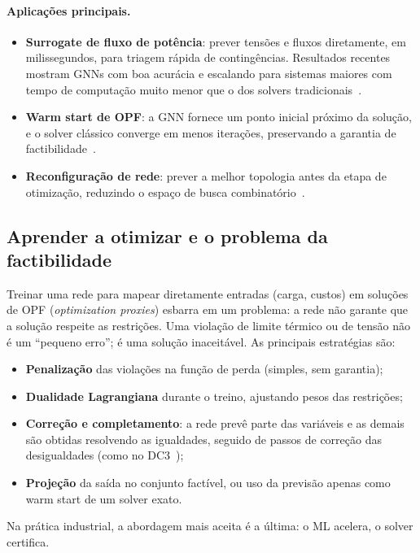 \documentclass[10pt,a4paper,oneside]{article}
\begin{document}
\paragraph{Aplicações principais.}
\begin{itemize}
  \item \textbf{Surrogate de fluxo de potência}: prever tensões e fluxos
    diretamente, em milissegundos, para triagem rápida de contingências.
    Resultados recentes mostram GNNs com boa acurácia e escalando para
    sistemas maiores com tempo de computação muito menor que o dos solvers
    tradicionais~\cite{gnnpf}.
  \item \textbf{Warm start de OPF}: a GNN fornece um ponto inicial próximo da
    solução, e o solver clássico converge em menos iterações, preservando a
    garantia de factibilidade~\cite{gnnopfinit}.
  \item \textbf{Reconfiguração de rede}: prever a melhor topologia antes da
    etapa de otimização, reduzindo o espaço de busca
    combinatório~\cite{gnnreconf}.
\end{itemize}

\subsection{Aprender a otimizar e o problema da factibilidade}

Treinar uma rede para mapear diretamente entradas (carga, custos) em
soluções de OPF (\textit{optimization proxies}) esbarra em um problema: a rede
não garante que a solução respeite as restrições. Uma violação de limite
térmico ou de tensão não é um ``pequeno erro''; é uma solução inaceitável. As
principais estratégias são:
\begin{itemize}
  \item \textbf{Penalização} das violações na função de perda (simples, sem
    garantia);
  \item \textbf{Dualidade Lagrangiana} durante o treino, ajustando pesos das
    restrições;
  \item \textbf{Correção e completamento}: a rede prevê parte das variáveis e
    as demais são obtidas resolvendo as igualdades, seguido de passos de
    correção das desigualdades (como no DC3~\cite{dc3});
  \item \textbf{Projeção} da saída no conjunto factível, ou uso da previsão
    apenas como warm start de um solver exato.
\end{itemize}
Na prática industrial, a abordagem mais aceita é a última: o ML acelera, o
solver certifica.
\end{document}
